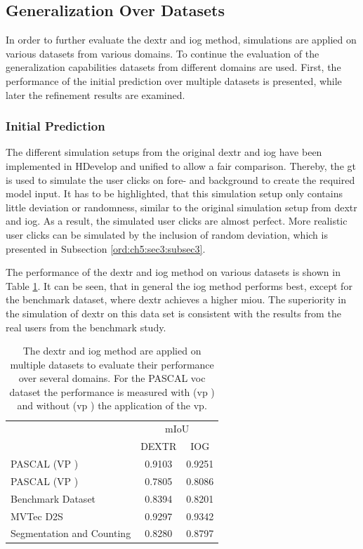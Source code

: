 \subsection{Generalization Over Datasets} \label{ord:ch5:sec2:subsec2}

In order to further evaluate the \gls{dextr} and \gls{iog} method, simulations are applied on various datasets from various domains.
To continue the evaluation of the generalization capabilities datasets from different domains are used.
First, the performance of the initial prediction over multiple datasets is presented, while later the refinement results are examined. 

\subsubsection{Initial Prediction}

The different simulation setups from the original \gls{dextr} \cite{Man18-DEXTR} and \gls{iog} \cite{Zha20-IOG} have been implemented in HDevelop and unified to allow a fair comparison. 
Thereby, the \gls{gt} is used to simulate the user clicks on fore- and background to create the required model input.
It has to be highlighted, that this simulation setup only contains little deviation or randomness, similar to the original simulation setup from \gls{dextr} and \gls{iog}.
As a result, the simulated user clicks are almost perfect.
More realistic user clicks can be simulated by the inclusion of random deviation, which is presented in Subsection \ref{ord:ch5:sec3:subsec3}.

The performance of the \gls{dextr} and \gls{iog} method on various datasets is shown in Table \ref{tab:ch5:tests_on_datasets}.
It can be seen, that in general the \gls{iog} method performs best, except for the benchmark dataset, where \gls{dextr} achieves a higher \gls{miou}.
The superiority in the simulation of \gls{dextr} on this data set is consistent with the results from the real users from the benchmark study.

\begin{table}[h!]
	\centering
	\begin{tabular}{l|c c}
		\toprule 		
										& \multicolumn{2}{c}{mIoU}\\
										&  DEXTR 	& IOG		\\
		\midrule
		PASCAL (VP \cmark)				& 0.9103 	& 0.9251	\\
		PASCAL (VP \xmark)				& 0.7805	& 0.8086	\\
		Benchmark Dataset				& 0.8394 	& 0.8201	\\
		MVTec D2S						& 0.9297	& 0.9342	\\
		Segmentation and Counting		& 0.8280	& 0.8797 	\\							
		\bottomrule
	\end{tabular}
	\caption[Generalization of IOG and DEXTR]{
		The \gls{dextr} and \gls{iog} method are applied on multiple datasets to evaluate their performance over several domains.
		For the PASCAL \gls{voc} dataset the performance is measured with (\gls{vp} \cmark) and without (\gls{vp} \xmark) the application of the \gls{vp}.
	}\label{tab:ch5:tests_on_datasets}
\end{table}

